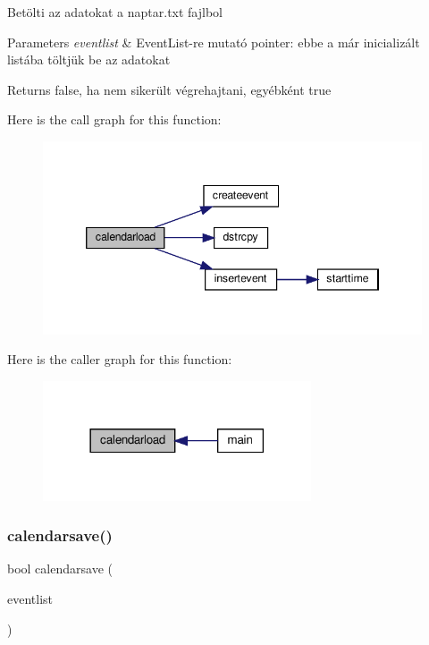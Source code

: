 Betölti az adatokat a naptar.\+txt fajlbol 
\begin{DoxyParams}{Parameters}
{\em eventlist} & Event\+List-\/re mutató pointer\+: ebbe a már inicializált listába töltjük be az adatokat \\
\hline
\end{DoxyParams}
\begin{DoxyReturn}{Returns}
false, ha nem sikerült végrehajtani, egyébként true 
\end{DoxyReturn}
Here is the call graph for this function\+:
\nopagebreak
\begin{figure}[H]
\begin{center}
\leavevmode
\includegraphics[width=346pt]{group__file_gaf4efa1e078c7552b2f70daf3a40039c7_cgraph}
\end{center}
\end{figure}
Here is the caller graph for this function\+:
\nopagebreak
\begin{figure}[H]
\begin{center}
\leavevmode
\includegraphics[width=225pt]{group__file_gaf4efa1e078c7552b2f70daf3a40039c7_icgraph}
\end{center}
\end{figure}
\mbox{\label{group__file_ga7f69872489b7c1c4bcdd125319a87b2e}} 
\subsubsection{\texorpdfstring{calendarsave()}{calendarsave()}}
{\footnotesize\ttfamily bool calendarsave (\begin{DoxyParamCaption}\item[{\hyperlink{struct_event_list}{Event\+List} const $\ast$}]{eventlist }\end{DoxyParamCaption})}

